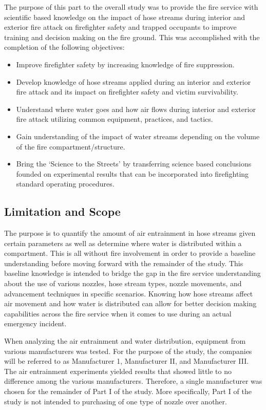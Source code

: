 \documentclass{article}
\begin{document}
The purpose of this part to the overall study was to provide the fire service with scientific based knowledge on the impact of hose streams during interior and exterior fire attack on firefighter safety and trapped occupants to improve training and decision making on the fire ground. This was accomplished with the completion of the following objectives:

\begin{itemize}
	\item Improve firefighter safety by increasing knowledge of fire suppression.
	\item Develop knowledge of hose streams applied during an interior and exterior fire attack and its impact on firefighter safety and victim survivability.
	\item Understand where water goes and how air flows during interior and exterior fire attack utilizing common equipment, practices, and tactics.
	\item Gain understanding of the impact of water streams depending on the volume of the fire compartment/structure.
	\item Bring the `Science to the Streets' by transferring science based conclusions founded on experimental results that can be incorporated into firefighting standard operating procedures.
	\end{itemize}

\clearpage

\subsection{Limitation and Scope}

The purpose is to quantify the amount of air entrainment in hose streams given certain parameters as well as determine where water is distributed within a compartment. This is all without fire involvement in order to provide a baseline understanding before moving forward with the remainder of the study. This baseline knowledge is intended to bridge the gap in the fire service understanding about the use of various nozzles, hose stream types, nozzle movements, and advancement techniques in specific scenarios. Knowing how hose streams affect air movement and how water is distributed can allow for better decision making capabilities across the fire service when it comes to use during an actual emergency incident.

When analyzing the air entrainment and water distribution, equipment from various manufacturers was tested. For the purpose of the study, the companies will be referred to as Manufacturer 1, Manufacturer II, and Manufacturer III. The air entrainment experiments yielded results that showed little to no difference among the various manufacturers. Therefore, a single manufacturer was chosen for the remainder of Part I of the study. More specifically, Part I of the study is not intended to purchasing of one type of nozzle over another.
\end{document}
